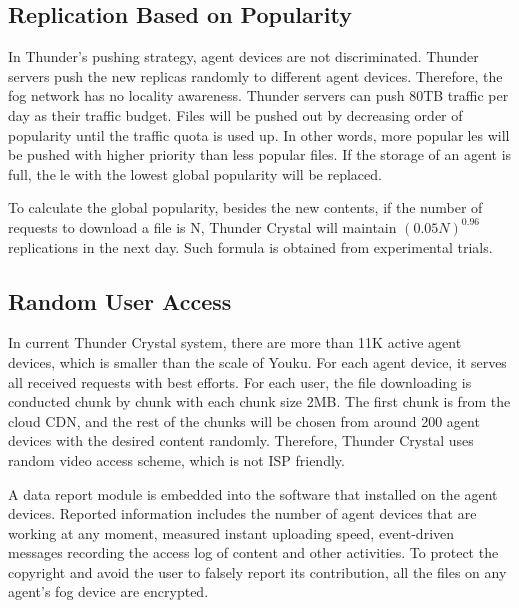 \subsection{Replication Based on Popularity}
\label{subsection_3}
In Thunder's pushing strategy, agent devices are not discriminated. Thunder servers push
the new replicas randomly to different agent devices. Therefore, the fog network has no
locality awareness. Thunder servers can push 80TB traffic per day as their traffic budget.
Files will be pushed out by decreasing order of popularity until the traffic quota is used up.
In other words, more popularles will be pushed with higher priority than less popular files.
If the storage of an agent is full, thele with the lowest global popularity will be replaced.

To calculate the global popularity, besides the new contents, if the number of requests to
download a file is N, Thunder Crystal will maintain $ (0.05N)^{0.96}$ replications in the next day.
Such formula is obtained from experimental trials.

\subsection{Random User Access}
\label{subsection_4}
In current Thunder Crystal system, there are more than 11K active agent devices, which
is smaller than the scale of Youku. For each agent device, it serves all received requests
with best efforts. For each user, the file downloading is conducted chunk by chunk with
each chunk size 2MB. The first chunk is from the cloud CDN, and the rest of the chunks
will be chosen from around 200 agent devices with the desired content randomly. Therefore,
Thunder Crystal uses random video access scheme, which is not ISP friendly.

A data report module is embedded into the software that installed on the agent devices.
Reported information includes the number of agent devices that are working at any moment,
measured instant uploading speed, event-driven messages recording the access log of content
and other activities. To protect the copyright and avoid the user to falsely report its
contribution, all the files on any agent's fog device are encrypted.
